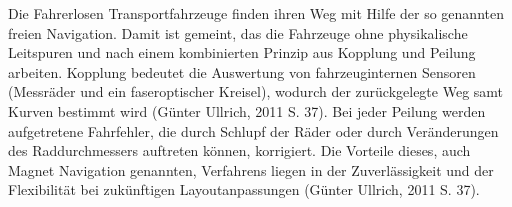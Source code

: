 Die Fahrerlosen Transportfahrzeuge finden ihren Weg mit Hilfe der so genannten freien Navigation. Damit ist gemeint, das die Fahrzeuge ohne physikalische Leitspuren und nach einem kombinierten Prinzip aus Kopplung und Peilung arbeiten. Kopplung bedeutet die Auswertung von fahrzeuginternen Sensoren (Messr\"ader und ein faseroptischer Kreisel), wodurch der zur\"uckgelegte Weg samt Kurven bestimmt wird (G\"unter Ullrich, 2011 S. 37). Bei jeder Peilung werden aufgetretene Fahrfehler, die durch Schlupf der R\"ader oder durch Ver\"anderungen des Raddurchmessers auftreten k\"onnen, korrigiert. Die Vorteile dieses, auch Magnet Navigation genannten, Verfahrens liegen in der Zuverl\"assigkeit und der Flexibilit\"at bei zuk\"unftigen Layoutanpassungen (G\"unter Ullrich, 2011 S. 37).


